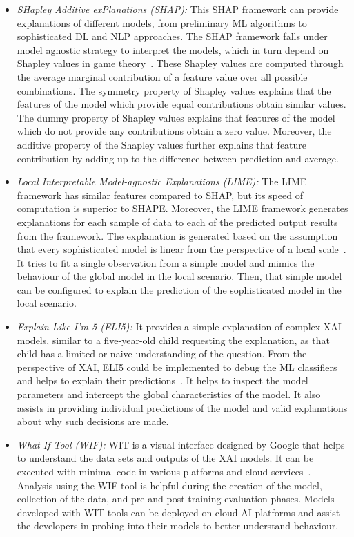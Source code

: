 \documentclass[journal]{IEEEtran}
\begin{document}
\begin{itemize}
    \item \textit{SHapley Additive exPlanations (SHAP):}
    This SHAP framework can provide explanations of different models, from preliminary ML algorithms to sophisticated DL and NLP approaches. The SHAP framework falls under model agnostic strategy to interpret the models, which in turn depend on Shapley values in game theory~\cite{antwarg2021explaining}. These Shapley values are computed through the average marginal contribution of a feature value over all possible combinations. The symmetry property of Shapley values explains that the features of the model which provide equal contributions obtain similar values. The dummy property of Shapley values explains that features of the model which do not provide any contributions obtain a zero value. Moreover, the additive property of the Shapley values further explains that feature contribution by adding up to the difference between prediction and average. 
    
    \item \textit{Local Interpretable Model-agnostic Explanations (LIME):}
    The LIME framework has similar features compared to SHAP, but its speed of computation is superior to SHAPE. Moreover, the LIME framework generates explanations for each sample of data to each of the predicted output results from the framework. The explanation is generated based on the assumption that every sophisticated model is linear from the perspective of a local scale~\cite{zafar2021deterministic}. It tries to fit a single observation from a simple model and mimics the behaviour of the global model in the local scenario. Then, that simple model can be configured to explain the prediction of the sophisticated model in the local scenario. 
    
    \item \textit{Explain Like I’m 5 (ELI5):} 
    It provides a simple explanation of complex XAI models, similar to a five-year-old child requesting the explanation, as that child has a limited or naive understanding of the question. From the perspective of XAI, ELI5 could be implemented to debug the ML classifiers and helps to explain their predictions~\cite{fan2019eli5}. It helps to inspect the model parameters and intercept the global characteristics of the model. It also assists in providing individual predictions of the model and valid explanations about why such decisions are made.
    
    \item \textit{What-If Tool (WIF):} 
    WIT is a visual interface designed by Google that helps to understand the data sets and outputs of the XAI models. It can be executed with minimal code in various platforms and cloud services~\cite{wexler2019if}. Analysis using the WIF tool is helpful during the creation of the model, collection of the data, and pre and post-training evaluation phases. Models developed with WIT tools can be deployed on cloud AI platforms and assist the developers in probing into their models to better understand behaviour. 
    

\end{itemize}
\end{document}
